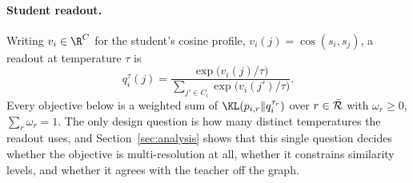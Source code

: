 \paragraph{Student readout.}
Writing $v_i\in\R^{C}$ for the student's cosine profile, $v_i(j) = \cos(s_i,s_j)$, a
readout at temperature $\tau$ is
\begin{equation}
    q_{i}^{\tau}(j) = \frac{\exp\big(v_i(j)/\tau\big)}{\sum_{j'\in C_i}\exp\big(v_i(j')/\tau\big)} .
    \label{eq:readout}
\end{equation}
Every objective below is a weighted sum of $\KL(p_{i,r}\Vert q_i^{\tau_r})$ over $r\in\bar{\mathcal{R}}$
with $\omega_r\geq0$, $\sum_r\omega_r=1$. The only design question is how many distinct
temperatures the readout uses, and Section~\ref{sec:analysis} shows that this single question
decides whether the objective is multi-resolution at all, whether it constrains similarity
levels, and whether it agrees with the teacher off the graph.
